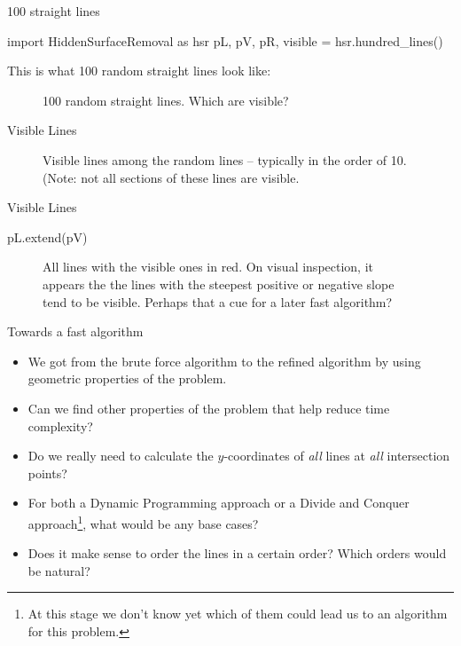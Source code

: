 \documentclass[ignorenonframetext,]{beamer}
\begin{document}
\begin{frame}[fragile]{100 straight lines}

  \begin{sympysilent}
    import HiddenSurfaceRemoval as hsr
    pL, pV, pR, visible = hsr.hundred_lines()
  \end{sympysilent}



  This is what 100 random straight lines look like:
  \begin{figure}
    \caption{100 random straight lines. Which are visible?}
    \centering
  \end{figure}
\end{frame}

\begin{frame}{Visible Lines}

  \begin{figure}
    \caption{Visible lines among the random lines -- typically in the
      order of 10. (Note: not all sections of these lines are visible.}
    \centering
  \end{figure}

\end{frame}

\begin{frame}[fragile]{Visible Lines}

  \begin{sympysilent}
    pL.extend(pV)
  \end{sympysilent}

  \begin{figure}
    \caption{All lines with the visible ones in red.   On visual inspection, it appears the the lines with the steepest
  positive or negative slope tend to be visible. Perhaps that a cue
  for a later fast algorithm?}
    \centering
  \end{figure}
\end{frame}

\begin{frame}{Towards a fast algorithm}

\begin{itemize}[<+->]
    \item We got from the brute force algorithm to the refined
      algorithm by using geometric properties of the problem. 
    \item Can we find other properties of the problem that help reduce
      time complexity? 
    \item Do we really need to calculate the $y$-coordinates of
      \emph{all} lines at \emph{all} intersection points? 
    \item For both a Dynamic Programming approach or a Divide and
      Conquer approach\footnote{At this stage we don't know yet which
        of them could lead us to an algorithm for this problem.}, 
      what would be any base cases?
    \item Does it make sense to order the lines in a certain order?
      Which orders would be natural? 
\end{itemize}
\end{frame}
\end{document}
